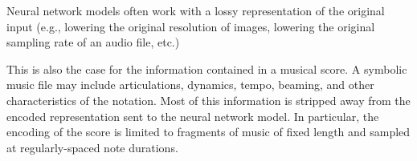
Neural network models often work with a lossy representation
of the original input (e.g., lowering the original
resolution of images, lowering the original sampling rate of
an audio file, etc.)

This is also the case for the information contained in a
musical score. A symbolic music file may include
articulations, dynamics, tempo, beaming, and other
characteristics of the notation. Most of this information is
stripped away from the encoded representation sent to the
neural network model. In particular, the encoding of the
score is limited to fragments of music of fixed length and
sampled at regularly-spaced note durations.
